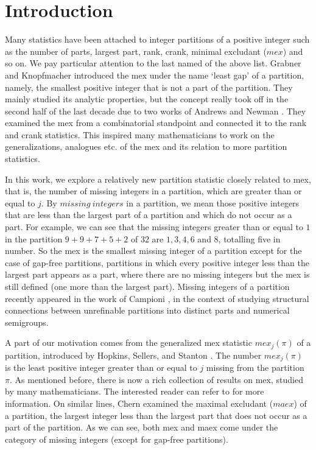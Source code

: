\documentclass[12pt,reqno]{amsart}
\renewcommand{\(}{\left\(}
\renewcommand{\)}{\right\)}
\renewcommand{\[}{\left\[}
\renewcommand{\]}{\right\]}
\numberwithin{equation}{section}
\theoremstyle{plain}
\begin{document}
\section{Introduction}
Many statistics have been attached to integer partitions of a positive integer such as the number of parts, largest part, rank, crank, minimal excludant ($mex$) and so on. We pay particular attention to the last named of the above list. Grabner and Knopfmacher \cite{grabner} introduced the mex under the name `least gap' of a partition, namely, the smallest positive integer that is not a part of the partition. They mainly studied its analytic properties, but the concept really took off in the second half of the last decade due to two works of Andrews and Newman \cite{andrewsnewmanI, andrewsnewmanII}. They examined the mex from a combinatorial standpoint and connected it to the rank and crank statistics. This inspired many mathematicians to work on the generalizations, analogues etc. of the mex and its relation to more partition statistics. 

In this work, we explore a relatively new partition statistic closely related to mex, that is, the number of missing integers in a partition, which are greater than or equal to $j$. By $missing \ integers$ in a partition, we mean those positive integers that are less than the largest part of a partition and which do not occur as a part. For example, we can see that the missing integers greater than or equal to $1$ in the partition $9+9+7+5+2$ of $32$ are $1, 3, 4, 6$ and $8$, totalling five in number. So the mex is the smallest missing integer of a partition except for the case of gap-free partitions, partitions in which every positive integer less than the largest part appears as a part, where there are no missing integers but the mex is still defined (one more than the largest part). Missing integers of a partition recently appeared in the work of Campioni \cite{Campioni}, in the context of studying structural connections between unrefinable partitions into distinct parts and numerical semigroups.

A part of our motivation comes from the generalized mex statistic $mex_j(\pi)$ of a partition, introduced by Hopkins, Sellers, and Stanton \cite{HoSeStan2022}. The number $mex_j(\pi)$ is the least positive integer greater than or equal to $j$ missing from the partition $\pi$. As mentioned before, there is now a rich collection of results on mex, studied by many mathematicians. The interested reader can refer to \cite{andrewsnewmanI, andrewsnewmanII, ballantine-merca, barman-singh, BBEM2023, KBEM2021, BEL22, BEM22, Chakraborty-Ray, sellers-dasilva} for more information. On similar lines, Chern \cite{chernmaex} examined the maximal excludant ($maex$) of a partition, the largest integer less than the largest part that does not occur as a part of the partition. As we can see, both mex and maex come under the category of missing integers (except for gap-free partitions).
\end{document}
